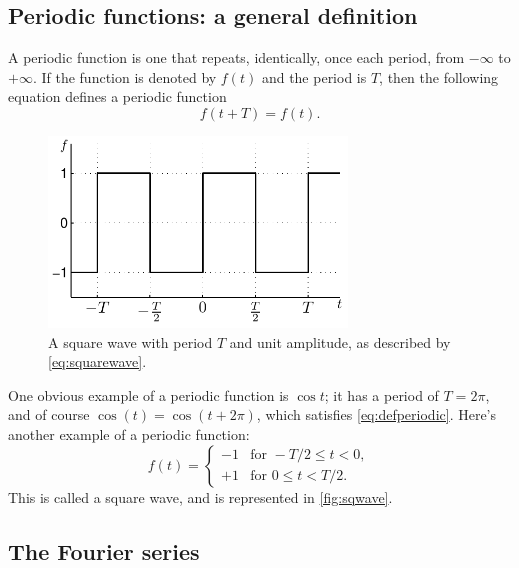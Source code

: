 \documentclass[11pt,twoside,a4paper]{article}
\begin{document}
\subsection{Periodic functions: a general definition}

A periodic function is one that repeats, identically, once each
period, from $-\infty$ to $+\infty$.  If the function is denoted by
$f(t)$ and the period is $T$, then the following equation defines
a periodic function
\begin{equation}
  \label{eq:defperiodic}
  f(t+T) = f(t).
\end{equation}

\begin{figure}
  \centering
  \includegraphics[height=2in]{../figs/L14/SquareWave}
  \caption{A square wave with period $T$ and unit amplitude, as
    described by \autoref{eq:squarewave}.  \vspace{1cm}}
  \label{fig:sqwave}
\end{figure}

One obvious example of a periodic function is $\cos t$; it has a
period of $T=2\pi$, and of course $\cos(t)=\cos(t+2\pi)$, which
satisfies \autoref{eq:defperiodic}. Here's another example of a
periodic function:
\begin{equation}
  \label{eq:squarewave}
  f(t) =
  \begin{cases}
    -1 & \text{for }-T/2\le t<0,\\
    +1 & \text{for }0\le t<T/2.
  \end{cases}
\end{equation}
This is called a square wave, and is represented in
\autoref{fig:sqwave}.

\subsection{The Fourier series}
\end{document}
